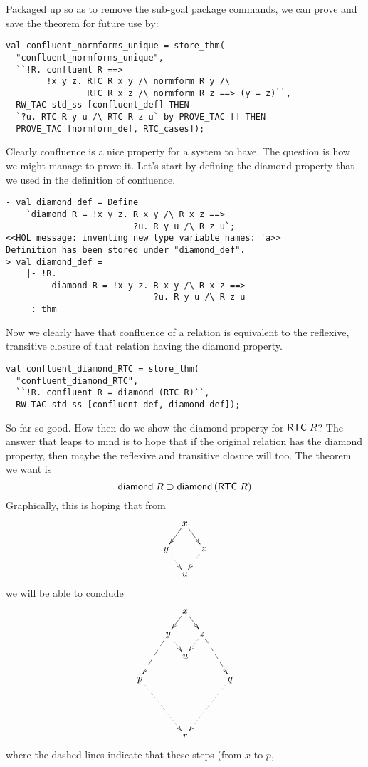 Packaged up so as to remove the sub-goal package commands, we can
prove and save the theorem for future use by:
\begin{session}
\begin{verbatim}
val confluent_normforms_unique = store_thm(
  "confluent_normforms_unique",
  ``!R. confluent R ==>
        !x y z. RTC R x y /\ normform R y /\
                RTC R x z /\ normform R z ==> (y = z)``,
  RW_TAC std_ss [confluent_def] THEN
  `?u. RTC R y u /\ RTC R z u` by PROVE_TAC [] THEN
  PROVE_TAC [normform_def, RTC_cases]);
\end{verbatim}
\end{session}
\eos{}

Clearly confluence is a nice property for a system to have.  The
question is how we might manage to prove it.  Let's start by defining
the diamond property that we used in the definition of confluence.
\begin{session}
\begin{verbatim}
- val diamond_def = Define
    `diamond R = !x y z. R x y /\ R x z ==>
                         ?u. R y u /\ R z u`;
<<HOL message: inventing new type variable names: 'a>>
Definition has been stored under "diamond_def".
> val diamond_def =
    |- !R.
         diamond R = !x y z. R x y /\ R x z ==>
                             ?u. R y u /\ R z u
     : thm
\end{verbatim}
\end{session}
    Now we clearly have that confluence of a relation is equivalent to
    the reflexive, transitive closure of that relation having the
    diamond property.
\begin{session}
\begin{verbatim}
val confluent_diamond_RTC = store_thm(
  "confluent_diamond_RTC",
  ``!R. confluent R = diamond (RTC R)``,
  RW_TAC std_ss [confluent_def, diamond_def]);
\end{verbatim}
\end{session}
    So far so good.  How then do we show the diamond property for
    ${\sf RTC}\;R$?  The answer that leaps to mind is to hope that if
    the original relation has the diamond property, then maybe the
    reflexive and transitive closure will too.  The theorem we want is
    \[ {\sf diamond}\;R \supset {\sf diamond}\,({\sf RTC}\;R)\] Graphically,
    this is hoping that from 
    \[\xymatrix @R=5mm @C=2.5mm {
& x \ar[dl] \ar[dr] & \\
y \ar@{.>}[dr] & & z \ar@{.>}[dl] \\
& u}\]
 we will be able to conclude\[\xymatrix @R=4mm @C=2mm {
& & & x \ar[dl] \ar[dr] & \\
& & y \ar@{.>}[dr] \ar@{-->}[ddll] & & z \ar@{.>}[dl] \ar@{-->}[ddrr] \\
& & & u \\
p \ar@{.>}[dddrrr] & & & & & & q \ar@{.>}[dddlll] \\ \\ \\
& & & r}\] where the dashed lines indicate that these steps (from $x$ to $p$,
